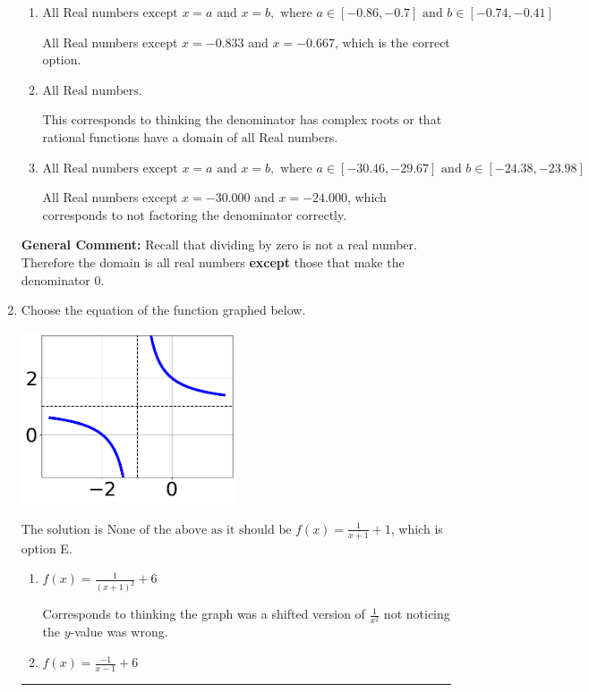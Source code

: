 \documentclass{extbook}[14pt]
\newcommand{\litem}[1]{\item #1

\rule{\textwidth}{0.4pt}}
\begin{document}
\begin{enumerate}
{\begin{enumerate}[label=\Alph*.]
All Real numbers except $x = -0.833$, which corresponds to removing only 1 value from the denominator.
\item \( \text{All Real numbers except } x = a \text{ and } x = b, \text{ where } a \in [-0.86, -0.7] \text{ and } b \in [-0.74, -0.41] \)

All Real numbers except $x = -0.833$ and $x = -0.667$, which is the correct option.
\item \( \text{All Real numbers.} \)

This corresponds to thinking the denominator has complex roots or that rational functions have a domain of all Real numbers.
\item \( \text{All Real numbers except } x = a \text{ and } x = b, \text{ where } a \in [-30.46, -29.67] \text{ and } b \in [-24.38, -23.98] \)

All Real numbers except $x = -30.000$ and $x = -24.000$, which corresponds to not factoring the denominator correctly.
\end{enumerate}

\textbf{General Comment:} Recall that dividing by zero is not a real number. Therefore the domain is all real numbers \textbf{except} those that make the denominator 0.
}
\litem{
Choose the equation of the function graphed below.

\begin{center}
    \includegraphics[width=0.5\textwidth]{../Figures/rationalGraphToEquationCopyB.png}
\end{center}


The solution is \( \text{None of the above as it should be } f(x) = \frac{1}{x + 1} + 1 \), which is option E.\begin{enumerate}[label=\Alph*.]
\item \( f(x) = \frac{1}{(x + 1)^2} + 6 \)

Corresponds to thinking the graph was a shifted version of $\frac{1}{x^2}$ not noticing the $y$-value was wrong.
\item \( f(x) = \frac{-1}{x - 1} + 6 \)


\end{enumerate}}
\end{enumerate}
\end{document}
